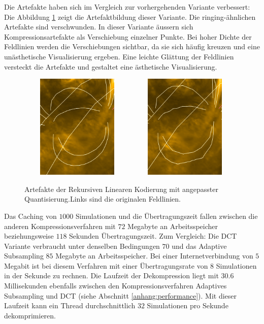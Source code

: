 Die Artefakte haben sich im Vergleich zur vorhergehenden Variante verbessert: Die Abbildung \ref{resultate:loesung2:adaptive:median_extra:artefakte} zeigt die Artefaktbildung dieser Variante. Die ringing-ähnlichen Artefakte sind verschwunden. In dieser Variante äussern sich Kompressionsartefakte als Verschiebung einzelner Punkte. Bei hoher Dichte der Feldlinien werden die Verschiebungen sichtbar, da sie sich häufig kreuzen und eine unästhetische Visualisierung ergeben. Eine leichte Glättung der Feldlinien versteckt die Artefakte und gestaltet eine ästhetische Visualisierung.

\begin{figure}[!htbp]
	\center
		\includegraphics[width=0.49\textwidth,height=5cm,keepaspectratio]{./pictures/resultate/loesung2/variante3/no_artifacts.png}
	\includegraphics[width=0.49\textwidth,height=5cm,keepaspectratio]{./pictures/resultate/loesung2/variante3/artifacts_extra.png}
	\caption{Artefakte der Rekursiven Linearen Kodierung mit angepasster Quantisierung.Links sind die originalen Feldlinien.}
	\label{resultate:loesung2:adaptive:median_extra:artefakte}
\end{figure}

Das Caching von $1000$ Simulationen und die Übertragungszeit fallen zwischen die anderen Kompressionsverfahren mit $72$ Megabyte an Arbeitsspeicher beziehungsweise $118$ Sekunden Übertragungszeit. Zum Vergleich: Die DCT Variante verbraucht unter denselben Bedingungen $70$ und das Adaptive Subsampling $85$ Megabyte an Arbeitsspeicher. Bei einer Internetverbindung von $5$ Megabit ist bei diesem Verfahren mit einer Übertragungsrate von $8$ Simulationen in der Sekunde zu rechnen. Die Laufzeit der Dekompression liegt mit $30.6$ Millisekunden ebenfalls zwischen den Kompressionsverfahren Adaptives Subsampling und DCT (siehe Abschnitt \ref{anhang:performance}). Mit dieser Laufzeit kann ein Thread durchschnittlich $32$ Simulationen pro Sekunde dekomprimieren.